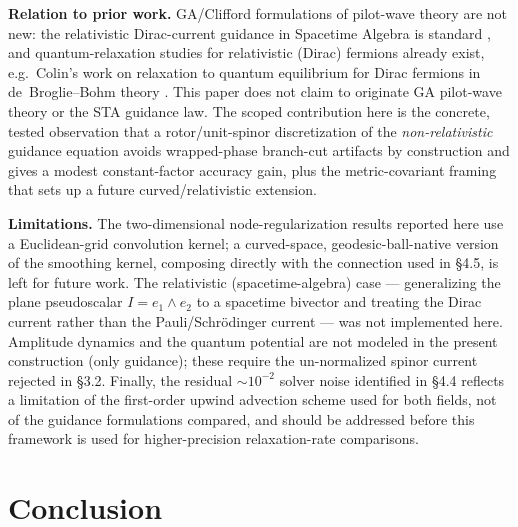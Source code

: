 \documentclass[11pt]{article}
\begin{document}
\textbf{Relation to prior work.} GA/Clifford formulations of pilot-wave theory are not new: the relativistic Dirac-current guidance in Spacetime Algebra is standard \cite{hestenes2003sta}, and quantum-relaxation studies for relativistic (Dirac) fermions already exist, e.g.\ Colin's work on relaxation to quantum equilibrium for Dirac fermions in de~Broglie--Bohm theory \cite{colin2012dirac}. This paper does not claim to originate GA pilot-wave theory or the STA guidance law. The scoped contribution here is the concrete, tested observation that a rotor/unit-spinor discretization of the \emph{non-relativistic} guidance equation avoids wrapped-phase branch-cut artifacts by construction and gives a modest constant-factor accuracy gain, plus the metric-covariant framing that sets up a future curved/relativistic extension.

\textbf{Limitations.} The two-dimensional node-regularization results reported here use a Euclidean-grid convolution kernel; a curved-space, geodesic-ball-native version of the smoothing kernel, composing directly with the connection used in \S4.5, is left for future work. The relativistic (spacetime-algebra) case — generalizing the plane pseudoscalar $I=e_1\wedge e_2$ to a spacetime bivector and treating the Dirac current rather than the Pauli/Schr\"odinger current — was not implemented here. Amplitude dynamics and the quantum potential are not modeled in the present construction (only guidance); these require the un-normalized spinor current rejected in \S3.2. Finally, the residual $\sim10^{-2}$ solver noise identified in \S4.4 reflects a limitation of the first-order upwind advection scheme used for both fields, not of the guidance formulations compared, and should be addressed before this framework is used for higher-precision relaxation-rate comparisons.

\section{Conclusion}
\end{document}
